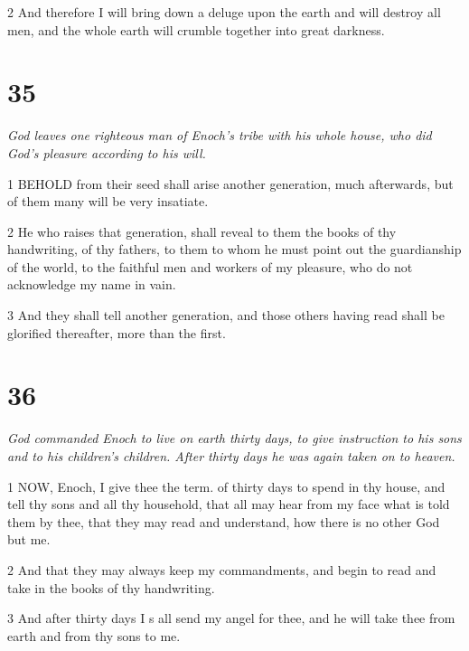 \par 2 And therefore I will bring down a deluge upon the earth and will destroy all men, and the whole earth will crumble together into great darkness.

\chapter{35}

\par \textit{God leaves one righteous man of Enoch's tribe with his whole house, who did God's pleasure according to his will.}

\par 1 BEHOLD from their seed shall arise another generation, much afterwards, but of them many will be very insatiate.

\par 2 He who raises that generation, shall reveal to them the books of thy handwriting, of thy fathers, to them to whom he must point out the guardianship of the world, to the faithful men and workers of my pleasure, who do not acknowledge my name in vain.

\par 3 And they shall tell another generation, and those others having read shall be glorified thereafter, more than the first.

\chapter{36}

\par \textit{God commanded Enoch to live on earth thirty days, to give instruction to his sons and to his children's children. After thirty days he was again taken on to heaven.}

\par 1 NOW, Enoch, I give thee the term. of thirty days to spend in thy house, and tell thy sons and all thy household, that all may hear from my face what is told them by thee, that they may read and understand, how there is no other God but me.

\par 2 And that they may always keep my commandments, and begin to read and take in the books of thy handwriting.

\par 3 And after thirty days I s all send my angel for thee, and he will take thee from earth and from thy sons to me.

